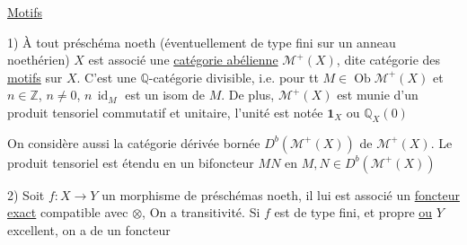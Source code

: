 \uline{Motifs}

1) À tout préschéma noeth (éventuellement de type fini sur un anneau
noethérien) $X$ est associé une \uline{catégorie abélienne}
$\mathcal{M}^+(X)$, dite catégorie des \uline{motifs}  sur $X$.
C'est une
$\mathbb{Q}$-catégorie  divisible, i.e. pour tt
$M\in\operatorname{Ob}\mathcal{M}^+(X)$ et $n\in\mathbb{Z}$, $n\ne0$,
$n\,\operatorname{id}_M$ est un isom
de $M$. De plus, $\mathcal{M}^+(X)$ est munie d'un
produit tensoriel commutatif et unitaire,
l'unité est notée $\mathbf1_X$ ou $\mathbb{Q}_X(0)$


On considère aussi la catégorie dérivée bornée
$D^b(\mathcal{M}^+(X))$ de $\mathcal{M}^+(X)$. Le produit tensoriel est
étendu en un bifoncteur $M$\uuline{$\otimes$}$N$ en $M,N\in D^b(\mathcal{M}^+(X))$

2) Soit $f:X\longrightarrow Y$ un morphisme de préschémas
 noeth, il lui est associé un \uline{foncteur}
\uline{exact}
compatible avec $\otimes$,
On a transitivité.
Si $f$ est de type fini, et propre \uline{ou} $Y$ excellent,
on  a de  un foncteur
